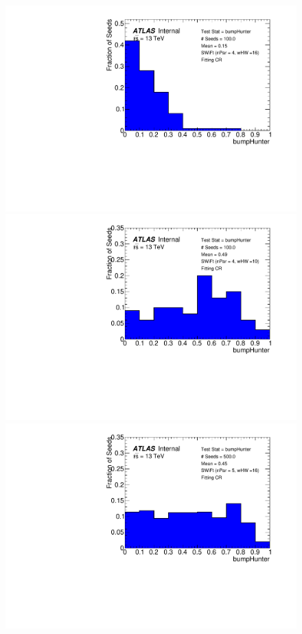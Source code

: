 \begin{figure}[!htb]
\captionsetup[subfigure]{aboveskip=0pt,justification=centering}
\centering
{} {
  \includegraphics[width=0.45\linewidth, angle=0]{figs/Dibjet/LowMass/FitStudy_min566/pVal_bumpHunter_corrFitCR_4para_low16_high16.pdf}
}                                                                                              
 {                                                    
  \includegraphics[width=0.45\linewidth, angle=0]{figs/Dibjet/LowMass/FitStudy_min566/pVal_bumpHunter_corrFitCR_4para_low10_high10.pdf}
}                                                                                              
 {                                                    
  \includegraphics[width=0.45\linewidth, angle=0]{figs/Dibjet/LowMass/FitStudy_min566/pVal_bumpHunter_corrFitCR_5para_low16_high16.pdf}
}
\end{figure}
